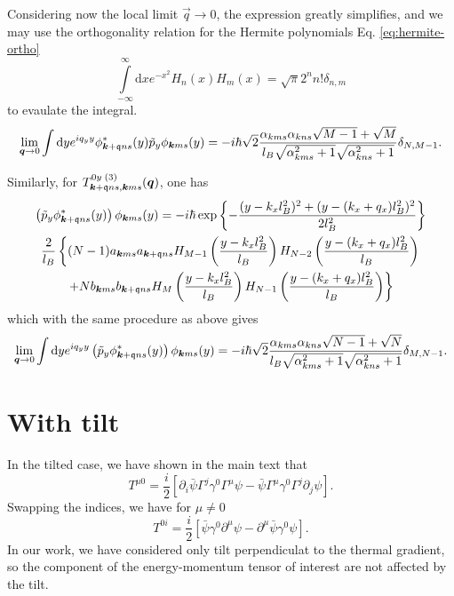 Considering now the local limit \( \vec{q} \to 0 \), the expression greatly simplifies, and we may use the orthogonality relation for the Hermite polynomials Eq. \eqref{eq:hermite-ortho}
\[
  \int\limits_{-\infty}^{\infty} \mathrm{d}x e^{-x^2} H_n(x)H_m(x) = \sqrt{\pi} 2^{n} n! \delta_{n,m}
\]
to evaulate the integral.
\begin{equation}
  \label{eq:120}
  \lim_{\bm{q} \to 0} \int \mathrm{d}y e^{iq_y y} \phi ^{*}_{\bm{k}+\mathfrak{q} ns}(y) \tilde{p}_y \phi _{\bm{k} ms}(y) =
  -i \hbar \sqrt{2}
  \frac{
    \alpha_{k m s} \alpha_{k n s} \sqrt{M-1}
    +
    \sqrt{M}
  }{
    {l_{B} \sqrt{\alpha_{k m s}^2 + 1}\sqrt{\alpha_{k n s} ^2 + 1}}
  }
  \delta_{N, M-1}.
\end{equation}

Similarly, for $T^{0y\; (3)}_{\bm{k}+\mathfrak{q}ns, \bm{k}ms} (\bm{q})$, one has
\begin{multline}
  \left( \tilde{p}_y \phi ^{*}_{\bm{k}+\mathfrak{q} ns}(y) \right)
  \phi _{\bm{k} m s}(y) =
  -i \hbar \exp \left\{
    - \frac{(y-k_xl_B^2)^2 + (y-(k_x + q_x) l_B^2)^2}{2 l_B^2}
  \right\}\\
  \frac{2}{l_{B}} \left\{
    (N-1) a_{\bm{k} m s} a_{\bm{k} + \mathfrak{q} n s} H_{M-1} \left( \frac{y-k_xl_B^2}{l_B} \right)H_{N-2} \left( \frac{y - (k_x + q_x) l_B^2}{l_B} \right) \right.\\
  \left. +
    N b_{\bm{k} m s} b_{\bm{k}+\mathfrak{q} n s} H_M \left( \frac{y - k_xl_B^2}{l_B} \right) H_{N-1}\left( \frac{y-(k_x+q_x) l_B^2}{l_B} \right)
  \right\}
\end{multline}
which with the same procedure as above gives
\begin{equation}
 \lim_{\bm{q}\to 0} \int \mathrm{d}y e^{iq_y y}
  \left( \tilde{p}_y \phi ^{*}_{\bm{k}+\mathfrak{q} ns}(y) \right)
  \phi _{\bm{k} m s}(y)
  =
  -i \hbar \sqrt{2}
  \frac{
    \alpha_{k m s} \alpha_{k n s} \sqrt{N-1}
    +
    \sqrt{N}
  }{
    {l_{B} \sqrt{\alpha_{k m s}^2 + 1}\sqrt{\alpha_{k n s} ^2 + 1}}
  }
  \delta_{M, N-1}.
\end{equation}

\section{With tilt}
In the tilted case, we have shown in the main text that 
\[
  T^{\mu 0} = \frac{i}{2}
  \left[\partial_i \bar{\psi} \Gamma^j \gamma^0 \Gamma^{\mu} \psi
    - \bar{\psi} \Gamma^{\mu} \gamma^0 \Gamma^j \partial_j \psi
  \right].
\]
Swapping the indices, we have for \( \mu \neq 0 \) \cite{vanderwurffMagnetovorticalThermoelectricTransport2019}
\[
  T^{0 i} = \frac{i}{2} [\bar{\psi} \gamma^0 \partial^{\mu } \psi
  - \partial^{\mu }\bar{\psi} \gamma^{0 } \psi ].
\]
In our work, we have considered only tilt perpendiculat to the thermal gradient,  so the component of the energy-momentum tensor of interest are not affected by the tilt.

